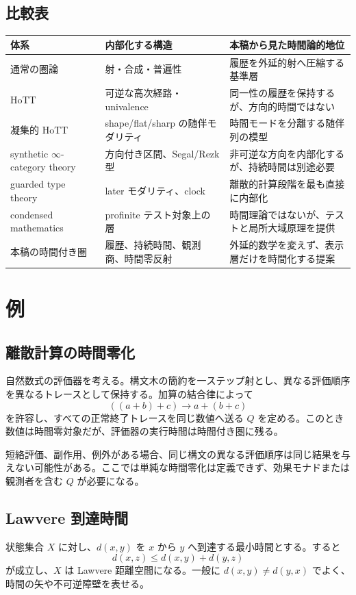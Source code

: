 \documentclass[a4paper,11pt]{ltjsarticle}
\theoremstyle{remark}
\begin{document}
\subsection{比較表}
\begin{longtable}{>{\raggedright\arraybackslash}p{31mm}>{\raggedright\arraybackslash}p{45mm}>{\raggedright\arraybackslash}p{65mm}}
\toprule
体系 & 内部化する構造 & 本稿から見た時間論的地位 \\
\midrule
通常の圏論 & 射・合成・普遍性 & 履歴を外延的射へ圧縮する基準層 \\
HoTT & 可逆な高次経路・univalence & 同一性の履歴を保持するが、方向的時間ではない \\
凝集的 HoTT & shape/flat/sharp の随伴モダリティ & 時間モードを分離する随伴列の模型 \\
synthetic $\infty$-category theory & 方向付き区間、Segal/Rezk 型 & 非可逆な方向を内部化するが、持続時間は別途必要 \\
guarded type theory & later モダリティ、clock & 離散的計算段階を最も直接に内部化 \\
condensed mathematics & profinite テスト対象上の層 & 時間理論ではないが、テストと局所大域原理を提供 \\
本稿の時間付き圏 & 履歴、持続時間、観測商、時間零反射 & 外延的数学を変えず、表示層だけを時間化する提案 \\
\bottomrule
\end{longtable}

\section{例}

\subsection{離散計算の時間零化}
自然数式の評価器を考える。構文木の簡約を一ステップ射とし、異なる評価順序を異なるトレースとして保持する。加算の結合律によって
\begin{equation}
 ((a+b)+c)\longrightarrow a+(b+c)
\end{equation}
を許容し、すべての正常終了トレースを同じ数値へ送る $Q$ を定める。このとき数値は時間零対象だが、評価器の実行時間は時間付き圏に残る。

短絡評価、副作用、例外がある場合、同じ構文の異なる評価順序は同じ結果を与えない可能性がある。ここでは単純な時間零化は定義できず、効果モナドまたは観測者を含む $Q$ が必要になる。

\subsection{Lawvere 到達時間}
状態集合 $X$ に対し、$d(x,y)$ を $x$ から $y$ へ到達する最小時間とする。すると
\begin{equation}
 d(x,z)\leq d(x,y)+d(y,z)
\end{equation}
が成立し、$X$ は Lawvere 距離空間になる。一般に $d(x,y)\neq d(y,x)$ でよく、時間の矢や不可逆障壁を表せる。
\end{document}
